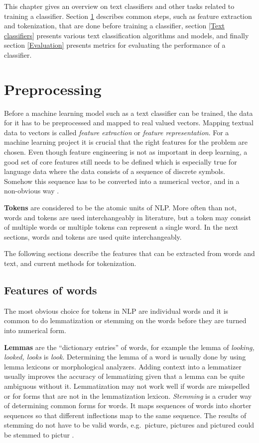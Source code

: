 This chapter gives an overview on text classifiers and other tasks related to training a classifier.
Section \ref{Preprocessing} describes common steps, such as feature extraction and tokenization, that are done before training a classifier, section \ref{Text classifiers} presents various text classification algorithms and models, and finally section \ref{Evaluation} presents metrics for evaluating the performance of a classifier.

\section{Preprocessing}\label{Preprocessing}
Before a machine learning model such as a text classifier can be trained, the data for it has to be preprocessed and mapped to real valued vectors.
Mapping textual data to vectors is called \textit{feature extraction} or \textit{feature representation}.
For a machine learning project it is crucial that the right features for the problem are chosen.
Even though feature engineering is not as important in deep learning, a good set of core features still needs to be defined which is especially true for language data where the data consists of a sequence of discrete symbols.
Somehow this sequence has to be converted into a numerical vector, and in a non-obvious way \cite{goldberg2017}.

\textbf{Tokens} are considered to be the atomic units of NLP.
More often than not, words and tokens are used interchangeably in literature, but a token may consist of multiple words or multiple tokens can represent a single word.
In the next sections, words and tokens are used quite interchangeably.

The following sections describe the features that can be extracted from words and text, and current methods for tokenization.

\subsection{Features of words}\label{Features of words}
The most obvious choice for tokens in NLP are individual words and it is common to do lemmatization or stemming on the words before they are turned into numerical form.

\textbf{Lemmas} are the ``dictionary entries'' of words, for example the lemma of \textit{looking, looked, looks} is \textit{look}.
Determining the lemma of a word is usually done by using lemma lexicons or morphological analyzers.
Adding context into a lemmatizer usually improves the accuracy of lemmatizing given that a lemma can be quite ambiguous without it.
Lemmatization may not work well if words are misspelled or for forms that are not in the lemmatization lexicon.
\textit{Stemming} is a cruder way of determining common forms for words.
It maps sequences of words into shorter sequences so that different inflections map to the same sequence.
The results of stemming do not have to be valid words, e.g.\ picture, pictures and pictured could be stemmed to pictur \cite{goldberg2017}.

